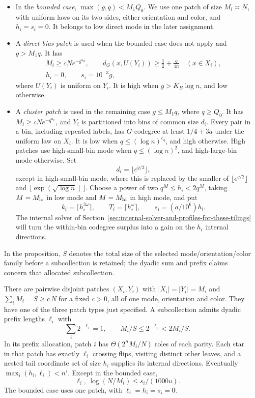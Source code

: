 \begin{itemize}
\item In the \emph{bounded case}, \(\max(g,q)<M_1Q_0\). We use one
patch of size \(M_i\asymp N\), with uniform laws on its two sides,
either orientation and color, and \(h_i=s_i=0\). It belongs to low
direct mode in the later assignment.
\item A \emph{direct bias patch} is used when the bounded case does not
apply and \(g>M_1q\). It has
\[
 \begin{gathered}
 M_i\ge cNe^{-g^{a_B}},\qquad
 d_G(x,U(Y_i))\ge\tfrac12+\frac{g}{4n}\quad(x\in X_i),\\
 h_i=0,\qquad s_i=10^{-3}g,
 \end{gathered}
\]
where \(U(Y_i)\) is uniform on \(Y_i\). It is high when
\(g>K_B\log n\), and low otherwise.
\item A \emph{cluster patch} is used in the remaining case
\(g\le M_1q\), where \(q\ge Q_0\). It has
\(M_i\ge cNe^{-q^{a_C}}\), and \(Y_i\) is partitioned into bins
of common size \(d_i\). Every pair in a bin, including repeated labels,
has \(G\)-codegree at least \(1/4+3a\) under the uniform law on \(X_i\).
It is low when \(q\le(\log n)^{c_q}\), and high otherwise. High patches
use high-small-bin mode when \(q\le(\log n)^2\), and high-large-bin mode
otherwise. Set
\[
 d_i=\lfloor e^{q/2}\rfloor,
\]
except in high-small-bin mode, where this is replaced by the smaller of
\(\lfloor e^{q/2}\rfloor\) and
\(\lfloor\exp(\sqrt{\log n})\rfloor\). Choose a power of two
\(q^M\le h_i<2q^M\), taking \(M=M_{\rm lo}\) in low mode and
\(M=M_{\rm hi}\) in high mode, and put
\[
 k_i=\lceil h_i^{3\omega}\rceil,\qquad
 T_i=\lceil h_i^\omega\rceil,\qquad s_i=(a/10^6)h_i.
\]
The internal solver of Section~\ref{sec:internal-solver-and-profiles-for-these-tilings}
will turn the within-bin codegree surplus into a gain on the \(h_i\)
internal directions.
\end{itemize}

In the proposition, \(S\) denotes the total size of the selected
mode/orientation/color family before a subcollection is retained; the
dyadic sum and prefix claims concern that allocated subcollection.

\begin{proposition}\label{prop:patch-extraction-allocation}
There are pairwise disjoint patches \((X_i,Y_i)\) with \(|X_i|=|Y_i|=M_i\) and \(\sum_i M_i=S\ge c\,N\) for a fixed \(c>0\), all of one mode, orientation and color. They have one of the three patch types just specified. A subcollection admits dyadic prefix lengths \(\ell_i\) with
\[
 \sum_i2^{-\ell_i}=1,\qquad
 M_i/S\le 2^{-\ell_i}<2M_i/S.
\]
In its prefix allocation, patch \(i\) has \(\Theta(2^nM_i/N)\) roles of each parity. Each star in that patch has exactly \(\ell_i\) crossing flips, visiting distinct other leaves, and a nested tail coordinate set of size \(h_i\) supplies its internal directions. Eventually \(\max_i(h_i,\ell_i)<n^\iota\). Except in the bounded case,
\[
 \ell_i,\ \log(N/M_i)\le s_i/(1000u).
\]
The bounded case uses one patch, with \(\ell_i=h_i=s_i=0\).
\end{proposition}

